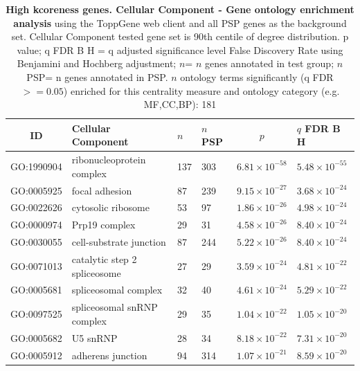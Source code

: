   \begin{table}[ht]
\centering
\begin{adjustbox}{width=\textwidth}
\setlength{\extrarowheight}{2pt}
\begin{tabular}{@{}clllcl@{}}
  \toprule
  ID & Cellular Component & $n$ & $n$ PSP & $p$ & $q$ FDR B H \\ 

  \midrule
GO:1990904 & ribonucleoprotein complex & 137 & 303 & $6.81 \times 10^{-58}$ & $5.48 \times 10^{-55}$ \\ 
  GO:0005925 & focal adhesion & 87 & 239 & $9.15 \times 10^{-27}$ & $3.68 \times 10^{-24}$ \\ 
  GO:0022626 & cytosolic ribosome & 53 & 97 & $1.86 \times 10^{-26}$ & $4.98 \times 10^{-24}$ \\ 
  GO:0000974 & Prp19 complex & 29 & 31 & $4.58 \times 10^{-26}$ & $8.40 \times 10^{-24}$ \\ 
  GO:0030055 & cell-substrate junction & 87 & 244 & $5.22 \times 10^{-26}$ & $8.40 \times 10^{-24}$ \\ 
  GO:0071013 & catalytic step 2 spliceosome & 27 & 29 & $3.59 \times 10^{-24}$ & $4.81 \times 10^{-22}$ \\ 
  GO:0005681 & spliceosomal complex & 32 & 40 & $4.61 \times 10^{-24}$ & $5.29 \times 10^{-22}$ \\ 
  GO:0097525 & spliceosomal snRNP complex & 29 & 35 & $1.04 \times 10^{-22}$ & $1.05 \times 10^{-20}$ \\ 
  GO:0005682 & U5 snRNP & 28 & 34 & $8.18 \times 10^{-22}$ & $7.31 \times 10^{-20}$ \\ 
  GO:0005912 & adherens junction & 94 & 314 & $1.07 \times 10^{-21}$ & $8.59 \times 10^{-20}$ \\ 
   \hline
\end{tabular}
\end{adjustbox}

\caption[Gene ontology enrichment High kcoreness genes Cellular Component of genes above 90th centile of distribution]{\textbf{High kcoreness genes. Cellular Component - Gene ontology enrichment analysis} using the ToppGene web client and all PSP genes as the background set.  Cellular Component tested gene set is 90th centile of degree distribution.  p value; q FDR B H = q adjusted significance level False Discovery Rate using Benjamini and Hochberg adjustment; $n$= $n$ genes annotated in test group; $n$ PSP= n genes annotated in PSP. $n$ ontology terms significantly (q FDR$>=0.05$) enriched for this centrality measure and ontology category (e.g. MF,CC,BP): 181} 
\label{tab:ToppGENE GO: Cellular Component. kco 90 centile cwpsp.txtp = p value; q FDR B H = q adjusted significance level False Discovery Rate using Benjamini and Hochberg adjustment; n= n genes annotated in test group; n PSP= n genes annotated in PSP. n significant in category 181}
\end{table}

